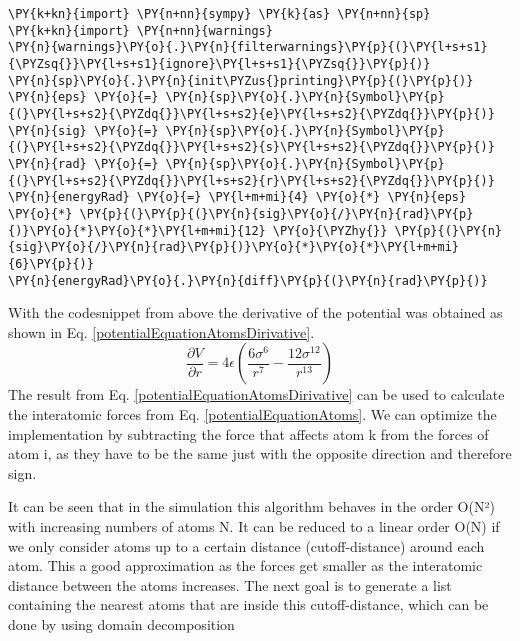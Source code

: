 \begin{tcolorbox}[breakable, size=fbox, boxrule=1pt, pad at break*=1mm,colback=cellbackground, colframe=cellborder]
\begin{Verbatim}[commandchars=\\\{\}]
\PY{k+kn}{import} \PY{n+nn}{sympy} \PY{k}{as} \PY{n+nn}{sp}
\PY{k+kn}{import} \PY{n+nn}{warnings}
\PY{n}{warnings}\PY{o}{.}\PY{n}{filterwarnings}\PY{p}{(}\PY{l+s+s1}{\PYZsq{}}\PY{l+s+s1}{ignore}\PY{l+s+s1}{\PYZsq{}}\PY{p}{)}
\PY{n}{sp}\PY{o}{.}\PY{n}{init\PYZus{}printing}\PY{p}{(}\PY{p}{)}
\PY{n}{eps} \PY{o}{=} \PY{n}{sp}\PY{o}{.}\PY{n}{Symbol}\PY{p}{(}\PY{l+s+s2}{\PYZdq{}}\PY{l+s+s2}{e}\PY{l+s+s2}{\PYZdq{}}\PY{p}{)}
\PY{n}{sig} \PY{o}{=} \PY{n}{sp}\PY{o}{.}\PY{n}{Symbol}\PY{p}{(}\PY{l+s+s2}{\PYZdq{}}\PY{l+s+s2}{s}\PY{l+s+s2}{\PYZdq{}}\PY{p}{)}
\PY{n}{rad} \PY{o}{=} \PY{n}{sp}\PY{o}{.}\PY{n}{Symbol}\PY{p}{(}\PY{l+s+s2}{\PYZdq{}}\PY{l+s+s2}{r}\PY{l+s+s2}{\PYZdq{}}\PY{p}{)}
\PY{n}{energyRad} \PY{o}{=} \PY{l+m+mi}{4} \PY{o}{*} \PY{n}{eps} \PY{o}{*} \PY{p}{(}\PY{p}{(}\PY{n}{sig}\PY{o}{/}\PY{n}{rad}\PY{p}{)}\PY{o}{*}\PY{o}{*}\PY{l+m+mi}{12} \PY{o}{\PYZhy{}} \PY{p}{(}\PY{n}{sig}\PY{o}{/}\PY{n}{rad}\PY{p}{)}\PY{o}{*}\PY{o}{*}\PY{l+m+mi}{6}\PY{p}{)}
\PY{n}{energyRad}\PY{o}{.}\PY{n}{diff}\PY{p}{(}\PY{n}{rad}\PY{p}{)}
	\end{Verbatim}
\end{tcolorbox}

With the codesnippet from above the derivative of the potential was obtained as shown in Eq. \ref{potentialEquationAtomsDirivative}.
\begin{equation}
	\label{potentialEquationAtomsDirivative}
	\frac{\partial V}{\partial r} = 4 \epsilon \left(\frac{6 \sigma^{6}}{r^{7}} - \frac{12 \sigma^{12}}{r^{13}}\right)
\end{equation}
The result from Eq. \ref{potentialEquationAtomsDirivative} can be used to calculate the interatomic forces from Eq. \ref {potentialEquationAtoms}. 
We can optimize the implementation by subtracting the force that affects atom k from the forces of atom i, as they have to be the same just with the opposite direction and therefore sign. 
\par 
It can be seen that in the simulation this algorithm behaves in the order O(N²) with increasing numbers of atoms N. It can be reduced to a linear order O(N) if we only consider atoms up to a certain distance (cutoff-distance) around each atom. This a good approximation as the forces get smaller as the interatomic distance between the atoms increases. The next goal is to generate a list containing the nearest atoms that are inside this cutoff-distance, which can be done by using domain decomposition \cite[cf.][]{molDymCourse}
